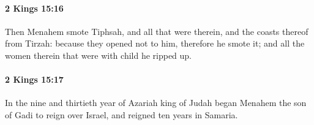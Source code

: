 		\paragraph{2 Kings 15:16} %
			\label{2KINGS-15-16}

			Then Menahem smote Tiphsah, and all that were therein, and the coasts thereof from Tirzah: because they opened not to him, therefore he smote it; and all the women therein that were with child he ripped up.


		\paragraph{2 Kings 15:17} %
			\label{2KINGS-15-17}

			In the nine and thirtieth year of Azariah king of Judah began Menahem the son of Gadi to reign over Israel, and reigned ten years in Samaria.


